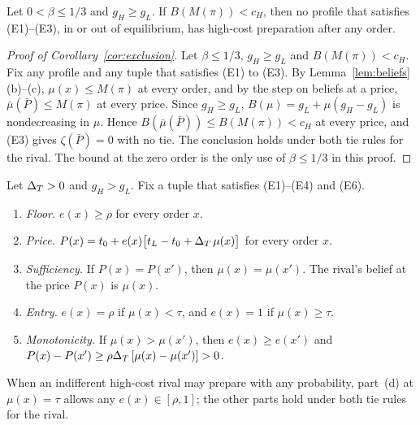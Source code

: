 \begin{corollary}\label{cor:exclusion}
Let \(0<\beta\le1/3\) and \(g_H\ge g_L\). If \(B(M(\pi))<c_H\), then no profile that satisfies (E1)--(E3), in or out of equilibrium,
has high-cost preparation after any order.
\end{corollary}

\begin{proof}[Proof of Corollary~\ref{cor:exclusion}]
Let \(\beta\le1/3\), \(g_H\ge g_L\) and \(B(M(\pi))<c_H\). Fix any profile and any tuple that satisfies (E1) to
(E3). By Lemma~\ref{lem:beliefs}(b)--(c), \(\mu(x)\le M(\pi)\) at every order, and by the step on beliefs at a price,
\(\bar\mu(\bar P)\le M(\pi)\) at every price. Since \(g_H\ge g_L\), \(B(\mu)=g_L+\mu(g_H-g_L)\) is nondecreasing in
\(\mu\). Hence \(B(\bar\mu(\bar P))\le B(M(\pi))<c_H\) at every price, and (E3) gives \(\zeta(\bar P)=0\) with no
tie. The conclusion holds under both tie rules for the rival. The bound at the zero order is the only use of
\(\beta\le1/3\) in this proof.
\end{proof}

\begin{lemma}\label{lem:prices}
Let \(\Delta_T>0\) and \(g_H>g_L\). Fix a tuple that satisfies (E1)--(E4) and (E6).
\begin{enumerate}[label=(\alph*),leftmargin=2em]
\item \emph{Floor.} \(e(x)\ge\rho\) for every order \(x\).
\item \emph{Price.} \(P(x)=t_0+e(x)\bigl[t_L-t_0+\Delta_T\,\mu(x)\bigr]\) for every order \(x\).
\item \emph{Sufficiency.} If \(P(x)=P(x')\), then \(\mu(x)=\mu(x')\). The rival's belief at the price \(P(x)\)
is \(\mu(x)\).
\item \emph{Entry.} \(e(x)=\rho\) if \(\mu(x)<\tau\), and \(e(x)=1\) if \(\mu(x)\ge\tau\).
\item \emph{Monotonicity.} If \(\mu(x)>\mu(x')\), then \(e(x)\ge e(x')\) and
\(P(x)-P(x')\ge\rho\Delta_T\,[\mu(x)-\mu(x')]>0\).
\end{enumerate}
\end{lemma}
When an indifferent high-cost rival may prepare with any probability, part~(d) at \(\mu(x)=\tau\) allows any \(e(x)\in[\rho,1]\); the other parts hold under both tie rules for the rival.

